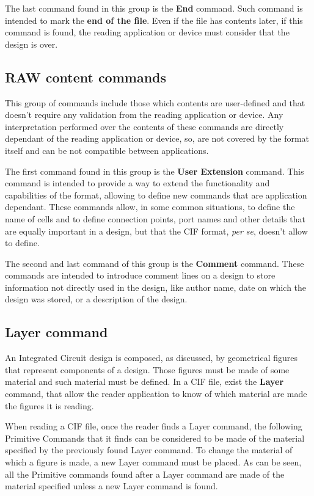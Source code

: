 \documentclass[11pt,twoside,openany,x11names,svgnames]{memoir}
\begin{document}
The last command found in this group is the \textbf{End} command. Such command is intended to mark the \textbf{end of the file}. Even if the file has contents later, if this command is found, the reading application or device must consider that the design is over.

\subsection{RAW content commands}\label{RAW-content-commands}

This group of commands include those which contents are user-defined and that doesn't require any validation from the reading application or device. Any interpretation performed over the contents of these commands are directly dependant of the reading application or device, so, are not covered by the format itself and can be not compatible between applications.

The first command found in this group is the \textbf{User Extension} command. This command is intended to provide a way to extend the functionality and capabilities of the format, allowing to define new commands that are application dependant. These commands allow, in some common situations, to define the name of cells and to define connection points, port names and other details that are equally important in a design, but that the CIF format, \textit{per se}, doesn't allow to define.

The second and last command of this group is the \textbf{Comment} command. These commands are intended to introduce comment lines on a design to store information not directly used in the design, like author name, date on which the design was stored, or a description of the design.

\subsection{Layer command}\label{Layer-command}

An Integrated Circuit design is composed, as discussed, by geometrical figures that represent components of a design. Those figures must be made of some material and such material must be defined. In a CIF file, exist the \textbf{Layer} command, that allow the reader application to know of which material are made the figures it is reading.

When reading a CIF file, once the reader finds a Layer command, the following Primitive Commands that it finds can be considered to be made of the material specified by the previously found Layer command. To change the material of which a figure is made, a new Layer command must be placed. As can be seen, all the Primitive commands found after a Layer command are made of the material specified unless a new Layer command is found.
\end{document}
